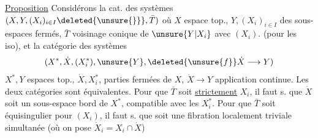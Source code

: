 \uline{Proposition} Considérons la cat. des
systèmes $(X,Y,(X_i)_{i\in I}\deleted{\unsure{\}}},\bar T)$ où
$X$ espace top., $Y,(X_i)_{i\in I}$ des sous-espaces fermés,
$\bar T$ voisinage conique de $\unsure{Y|X_i}$
 avec
$(X_i)$. (pour les iso), et la catégorie
des systèmes
\[
(X^*,\dot X,(X_i^*),\unsure{Y},
\deleted{\unsure{f}}\dot X\longrightarrow Y)
\]
$X^*,Y$ espaces top., $\dot X,X_i^*$, parties fermées de $X$,
$\dot X\longrightarrow Y$ application continue. Les deux
catégories sont équivalentes.
Pour que $\bar T$
soit \uline{strictement} 
 $X_i$,
il faut s. que $\dot X$ soit un sous-espace bord
de $X^*$,  compatible avec les $X_i^*$.
Pour que $\bar T$ soit équisingulier pour
$(X_i)$, il faut s. que
soit une fibration localement triviale
simultanée (où on pose $\dot X_i=X_i\cap\dot X$)
